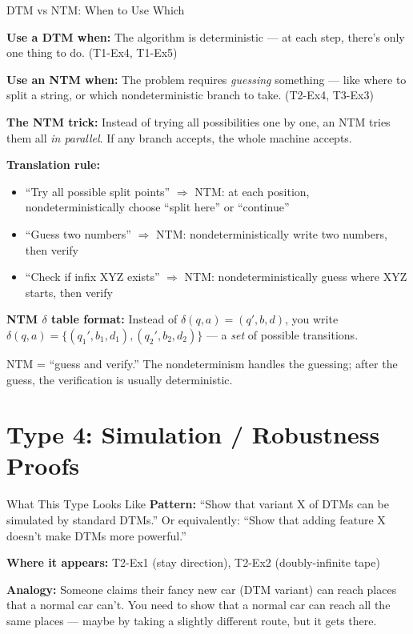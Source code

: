 \documentclass[11pt,a4paper]{article}
\newcommand{\keytakeaway}[1]{%
  \par\vspace{0.3em}%
  \colorbox{yellow!60}{\parbox{\dimexpr\linewidth-2\fboxsep}{#1}}%
  \vspace{0.3em}}
\begin{document}
\begin{conceptbox}{DTM vs NTM: When to Use Which}

\textbf{Use a DTM when:} The algorithm is deterministic --- at each step, there's only one thing to do. (T1-Ex4, T1-Ex5)

\textbf{Use an NTM when:} The problem requires \emph{guessing} something --- like where to split a string, or which nondeterministic branch to take. (T2-Ex4, T3-Ex3)

\textbf{The NTM trick:} Instead of trying all possibilities one by one, an NTM tries them all \emph{in parallel}. If any branch accepts, the whole machine accepts.

\textbf{Translation rule:}
\begin{itemize}
    \item ``Try all possible split points'' $\Rightarrow$ NTM: at each position, nondeterministically choose ``split here'' or ``continue''
    \item ``Guess two numbers'' $\Rightarrow$ NTM: nondeterministically write two numbers, then verify
    \item ``Check if infix XYZ exists'' $\Rightarrow$ NTM: nondeterministically guess where XYZ starts, then verify
\end{itemize}

\textbf{NTM $\delta$ table format:} Instead of $\delta(q,a) = (q', b, d)$, you write $\delta(q,a) = \{(q_1', b_1, d_1), (q_2', b_2, d_2)\}$ --- a \emph{set} of possible transitions.

\keytakeaway{NTM = ``guess and verify.'' The nondeterminism handles the guessing; after the guess, the verification is usually deterministic.}
\end{conceptbox}

\newpage
\section{Type 4: Simulation / Robustness Proofs}

\begin{notebox}{What This Type Looks Like}
\textbf{Pattern:} ``Show that variant X of DTMs can be simulated by standard DTMs.'' Or equivalently: ``Show that adding feature X doesn't make DTMs more powerful.''

\textbf{Where it appears:} T2-Ex1 (stay direction), T2-Ex2 (doubly-infinite tape)

\textbf{Analogy:} Someone claims their fancy new car (DTM variant) can reach places that a normal car can't. You need to show that a normal car can reach all the same places --- maybe by taking a slightly different route, but it gets there.
\end{notebox}
\end{document}
